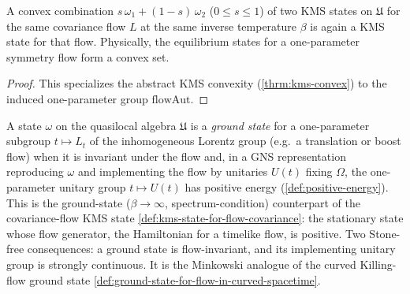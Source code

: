 \begin{theorem}
    \label{thrm:kms-convex-for-flow-covariance}
    \leanok
    A convex combination $s\,\omega_1 + (1-s)\,\omega_2$ ($0 \le s \le 1$) of two KMS states on $\mathfrak{U}$ for the same covariance flow $L$ at the same inverse temperature $\beta$ is again a KMS state for that flow. Physically, the equilibrium states for a one-parameter symmetry flow form a convex set.
\end{theorem}
\begin{proof}
    \leanok
    This specializes the abstract KMS convexity (\ref{thrm:kms-convex}) to the induced one-parameter group $\mathrm{flowAut}$.
\end{proof}

\begin{definition}
    \label{def:ground-state-for-flow-covariance}
    \leanok
    A state $\omega$ on the quasilocal algebra $\mathfrak{U}$ is a \emph{ground state} for a one-parameter subgroup $t \mapsto L_t$ of the inhomogeneous Lorentz group (e.g.\ a translation or boost flow) when it is invariant under the flow and, in a GNS representation reproducing $\omega$ and implementing the flow by unitaries $U(t)$ fixing $\Omega$, the one-parameter unitary group $t \mapsto U(t)$ has positive energy (\ref{def:positive-energy}). This is the ground-state ($\beta \to \infty$, spectrum-condition) counterpart of the covariance-flow KMS state \ref{def:kms-state-for-flow-covariance}: the stationary state whose flow generator, the Hamiltonian for a timelike flow, is positive. Two Stone-free consequences: a ground state is flow-invariant, and its implementing unitary group is strongly continuous. It is the Minkowski analogue of the curved Killing-flow ground state \ref{def:ground-state-for-flow-in-curved-spacetime}.
\end{definition}

